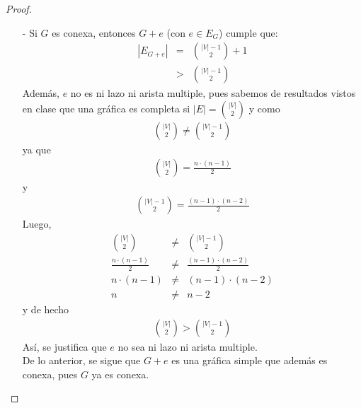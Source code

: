 \documentclass{article}
\begin{document}
\begin{enumerate}
\begin{enumerate}
\begin{proof}
        \begin{itemize}
          \item[-] Si $G$ es conexa, entonces $G+e$ (con $e \in E_G$) cumple que:
            \begin{eqnarray*}
              |E_{G +e}| &=& {|V| -1 \choose 2} +1\\
              &>& {|V| -1 \choose 2}
            \end{eqnarray*}
            Además, $e$ no es ni lazo ni arista multiple,
            pues sabemos de resultados vistos en clase que una gráfica es completa si
            $|E| = {|V| \choose 2}$ y como
            \begin{eqnarray*}
              {|V| \choose 2} \not= {|V| -1 \choose 2}
            \end{eqnarray*}
            ya que
            \begin{eqnarray*}
              {|V| \choose 2} = \frac{n \cdot (n -1)}{2}
            \end{eqnarray*}
            y
            \begin{eqnarray*}
              {|V| -1 \choose 2} = \frac{(n -1) \cdot (n -2)}{2}
            \end{eqnarray*}
            Luego,
            \begin{eqnarray*}
              {|V| \choose 2} &\not=& {|V| -1 \choose 2}\\
              \frac{n \cdot (n -1)}{2} &\not=& \frac{(n -1) \cdot (n -2)}{2}\\
              n \cdot (n -1) &\not=& (n -1) \cdot (n -2)\\
              n &\not=& n -2
            \end{eqnarray*}
            y de hecho
            \begin{eqnarray*}
              {|V| \choose 2} > {|V| -1 \choose 2}
            \end{eqnarray*}
            Así, se justifica que $e$ no sea ni lazo ni arista multiple. \\
            De lo anterior, se sigue que $G +e$ es una gráfica simple que además es conexa,
            pues $G$ ya es conexa. \\


\end{itemize}
\end{proof}
\end{enumerate}
\end{enumerate}
\end{document}
